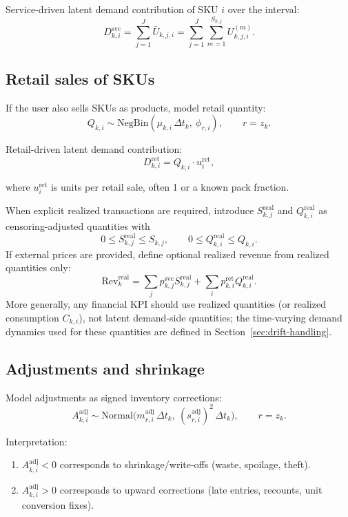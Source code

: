 \documentclass[11pt]{article}
\begin{document}
Service-driven latent demand contribution of SKU $i$ over the interval:
\[
  D^{\mathrm{svc}}_{k,i} = \sum_{j=1}^{J} \bar U_{k,j,i} = \sum_{j=1}^{J}\sum_{m=1}^{S_{k,j}} U^{(m)}_{k,j,i}.
\]

\subsection{Retail sales of SKUs}

If the user also sells SKUs as products, model retail quantity:
\[
  Q_{k,i} \sim \text{NegBin}(\mu_{k,i}\,\Delta t_k,\ \phi_{r,i}),\qquad r=z_k.
\]

Retail-driven latent demand contribution:
\[
  D^{\mathrm{ret}}_{k,i} = Q_{k,i} \cdot u^{\mathrm{ret}}_i,
\]

where $u^{\mathrm{ret}}_i$ is units per retail sale, often 1 or a known pack fraction.

When explicit realized transactions are required, introduce $S^{\mathrm{real}}_{k,j}$ and $Q^{\mathrm{real}}_{k,i}$ as censoring-adjusted quantities with
\[
  0\le S^{\mathrm{real}}_{k,j}\le S_{k,j},\qquad 0\le Q^{\mathrm{real}}_{k,i}\le Q_{k,i}.
\]
If external prices are provided, define optional realized revenue from realized quantities only:
\[
  \text{Rev}^{\mathrm{real}}_k = \sum_j p^{\mathrm{svc}}_{k,j} S^{\mathrm{real}}_{k,j} + \sum_i p^{\mathrm{ret}}_{k,i} Q^{\mathrm{real}}_{k,i}.
\]
More generally, any financial KPI should use realized quantities (or realized consumption $C_{k,i}$), not latent demand-side quantities; the time-varying demand dynamics used for these quantities are defined in Section~\ref{sec:drift-handling}.

\subsection{Adjustments and shrinkage}

Model adjustments as signed inventory corrections:
\[
  A^{\mathrm{adj}}_{k,i} \sim \text{Normal}\bigl(m^{\mathrm{adj}}_{r,i}\,\Delta t_k,\ (s^{\mathrm{adj}}_{r,i})^2\,\Delta t_k\bigr),\qquad r=z_k.
\]

Interpretation:
\begin{enumerate}
  \item $A^{\mathrm{adj}}_{k,i}<0$ corresponds to shrinkage/write-offs (waste, spoilage, theft).
  \item $A^{\mathrm{adj}}_{k,i}>0$ corresponds to upward corrections (late entries, recounts, unit conversion fixes).
\end{enumerate}
\end{document}
